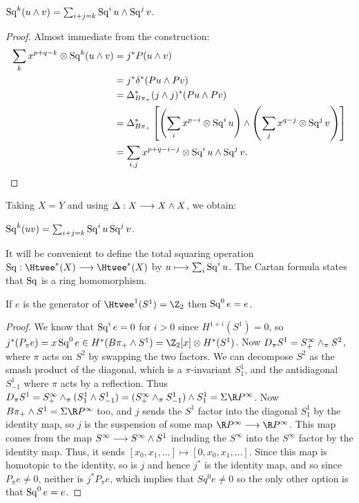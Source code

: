 \begin{cor}  
$\operatorname{Sq}^k(u \wedge v) = \sum_{i+j = k} \operatorname{Sq}^i u \wedge \operatorname{Sq}^j v$.
\end{cor}
%
\begin{proof} 
Almost immediate from the construction:
\begin{align*}
\sum_k x^{p+q-k} \otimes \Sq^k(u \sprod v) & = j^* P(u \sprod v) \\
& = j^* \delta^*(Pu \sprod Pv) \\
& = \Delta_{B \pi_+}^* (j \sprod j)^*(Pu \sprod Pv) \\
& = \Delta_{B \pi_+}^*\left[\left(\sum_i x^{p-i} \otimes \Sq^i u\right) \sprod \left(\sum_j x^{q-j} \otimes \Sq^j v\right)\right] \\ %
& = \sum_{i, j}x^{p+q-i-j} \otimes \Sq^i u \sprod \Sq^j v.\qedhere
\end{align*}
\end{proof}
\noindent
Taking $X = Y$ and using $\Delta: X \longrightarrow X \wedge X$, we obtain:
\begin{cor}  
$\operatorname{Sq}^k(uv) = \sum_{i+j=k} \operatorname{Sq}^i u \operatorname{Sq}^j v$.
\end{cor}
\noindent It will be convenient to define the total squaring operation $\Sq:\Htwee^*(X)\to\Htwee^*(X)$ by $ u\longmapsto\sum_i \operatorname{Sq}^i u$. The Cartan formula states that $\operatorname{Sq}$ is a ring homomorphism.

\begin{lem}
If $e$ is the generator of $\Htwee^1 (S^1) = \Z_2$ then $\operatorname{Sq}^0 e = e$.
\end{lem}

\begin{proof}
We know that $\operatorname{Sq}^i e = 0$ for $i>0$ since $H^{1+i}(S^1)=0$, so $j^*(P_{\pi}e)=x\Sq^0 e \in H^*(B\pi_+ \sprod S^1)=\Z_2[x]\otimes H^*(S^1)$.  Now $D_{\pi}S^1 = S^{\infty}_+\wedge_{\pi} S^2$, where $\pi$ acts on $S^2$ by swapping the two factors.  We can decompose $S^2$ as the smash product of the diagonal, which is a $\pi$-invariant $S^1_1$, and the antidiagonal $S^1_{-1}$ where $\pi$ acts by a reflection.  Thus $D_{\pi} S^1 = S^{\infty}_+ \sprod_\pi (S^1_1 \sprod S^1_{-1}) = (S^{\infty}_+\sprod_{\pi} S^1_{-1}) \sprod S^1_1 = \Sigma \RP^{\infty}$.  Now $B\pi_+\sprod S^1=\Sigma \RP^{\infty}$ too, and $j$ sends the $S^1$ factor into the diagonal $S^1_1$ by the identity map, so $j$ is the suspension of some map $\RP^{\infty}\to\RP^{\infty}$.  This map comes from the map $S^{\infty}\longrightarrow S^{\infty}\wedge S^1$ including the $S^{\infty}$ into the $S^{\infty}$ factor by the identity map.  Thus, it sends $[x_0,x_1,\ldots]\mapsto [0,x_0,x_1,\ldots]$.  Since this map is homotopic to the identity, so is $j$ and hence $j^*$ is the identity map, and so since $P_\pi e\neq 0$, neither is $j^*P_{\pi}e$, which implies that $Sq^0e\neq 0$ so the only other option is that $\operatorname{Sq}^0 e = e$.
\end{proof}

